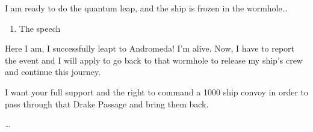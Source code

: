 I am ready to do the quantum leap, and the ship is frozen in the
wormhole\ldots{}

\begin{enumerate}
\def\labelenumi{\arabic{enumi}.}
\setcounter{enumi}{10}
\tightlist
\item
  The speech
\end{enumerate}

Here I am, I successfully leapt to Andromeda! I'm alive. Now, I have to
report the event and I will apply to go back to that wormhole to release
my ship's crew and continue this journey.

I want your full support and the right to command a 1000 ship convoy in
order to pass through that Drake Passage and bring them back.

\ldots{}
